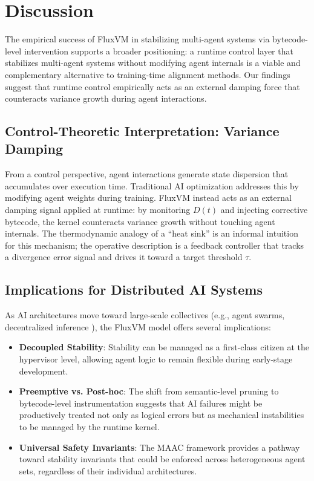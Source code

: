 \documentclass{article}
\begin{document}
\newpage

\section{Discussion}
\label{sec:discussion}

The empirical success of FluxVM in stabilizing multi-agent systems via bytecode-level intervention supports a broader positioning: a runtime control layer that stabilizes multi-agent systems without modifying agent internals is a viable and complementary alternative to training-time alignment methods. Our findings suggest that runtime control empirically acts as an external damping force that counteracts variance growth during agent interactions.

\subsection{Control-Theoretic Interpretation: Variance Damping}
From a control perspective, agent interactions generate state dispersion that accumulates over execution time. Traditional AI optimization addresses this by modifying agent weights during training. FluxVM instead acts as an external damping signal applied at runtime: by monitoring $D(t)$ and injecting corrective bytecode, the kernel counteracts variance growth without touching agent internals. The thermodynamic analogy of a ``heat sink'' is an informal intuition for this mechanism; the operative description is a feedback controller that tracks a divergence error signal and drives it toward a target threshold $\tau$.

\subsection{Implications for Distributed AI Systems}
As AI architectures move toward large-scale collectives (e.g., agent swarms, decentralized inference \cite{hoover2023autogen, hong2023metagpt}), the FluxVM model offers several implications:
\begin{itemize}
    \item \textbf{Decoupled Stability}: Stability can be managed as a first-class citizen at the hypervisor level, allowing agent logic to remain flexible during early-stage development.
    \item \textbf{Preemptive vs. Post-hoc}: The shift from semantic-level pruning to bytecode-level instrumentation suggests that AI failures might be productively treated not only as logical errors but as mechanical instabilities to be managed by the runtime kernel.
    \item \textbf{Universal Safety Invariants}: The MAAC framework provides a pathway toward stability invariants that could be enforced across heterogeneous agent sets, regardless of their individual architectures.
\end{itemize}
\end{document}
